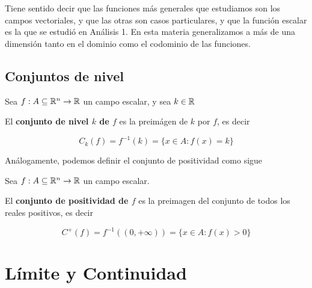 Tiene sentido decir que las funciones más generales que estudiamos son los campos vectoriales, y que las otras son casos particulares, y que la función escalar es la que se estudió en Análisis 1.  En esta materia generalizamos a más de una dimensión tanto en el dominio como el codominio de las funciones.

\section{Conjuntos de nivel}

\begin{definition}
Sea $f : A \subseteq \mathbb{R}^n \to \mathbb{R}$ un campo escalar, y sea $k \in \mathbb{R}$

El \textbf{conjunto de nivel $k$ de $f$}  es la preimágen de $k$ por $f$, es decir 

$$ C_k(f) = f^{-1}(k) = \{x \in A : f(x) = k \} $$
\end{definition}

Análogamente, podemos definir el conjunto de positividad como sigue

\begin{definition}[Positividad]
Sea $f : A \subseteq \mathbb{R}^n \to \mathbb{R}$ un campo escalar.

El \textbf{conjunto de positividad de $f$} es la preimagen del conjunto de todos los reales positivos, es decir

$$ C^+(f) = f^{-1}((0,+\infty)) = \{x \in A : f(x) > 0 \} $$
\end{definition}



\chapter{Límite y Continuidad}

